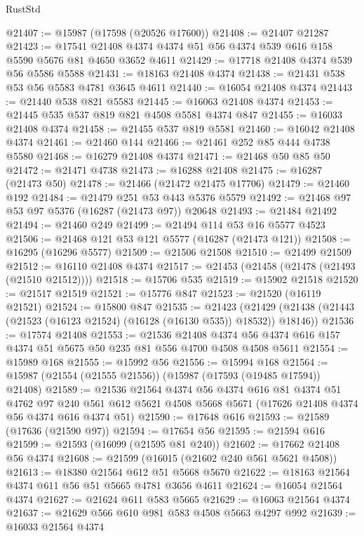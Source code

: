 \begin{lexlean}{RustStd}
\begin{coremodule}
@21407 := @15987 (@17598 (@20526 @17600))
@21408 := @21407 @21287
@21423 := @17541 @21408 @4374 @4374 @51 @56 @4374 @539 @616 @158 @5590 @5676 @81 @4650 @3652 @4611
@21429 := @17718 @21408 @4374 @539 @56 @5586 @5588
@21431 := @18163 @21408 @4374
@21438 := @21431 @538 @53 @56 @5583 @4781 @3645 @4611
@21440 := @16054 @21408 @4374
@21443 := @21440 @538 @821 @5583
@21445 := @16063 @21408 @4374
@21453 := @21445 @535 @537 @819 @821 @4508 @5581 @4374 @847
@21455 := @16033 @21408 @4374
@21458 := @21455 @537 @819 @5581
@21460 := @16042 @21408 @4374
@21461 := @21460 @144
@21466 := @21461 @252 @85 @444 @4738 @5580
@21468 := @16279 @21408 @4374
@21471 := @21468 @50 @85 @50
@21472 := @21471 @4738
@21473 := @16288 @21408
@21475 := @16287 (@21473 @50)
@21478 := @21466 (@21472 @21475 @17706)
@21479 := @21460 @192
@21484 := @21479 @251 @53 @443 @5376 @5579
@21492 := @21468 @97 @53 @97 @5376 (@16287 (@21473 @97)) @20648
@21493 := @21484 @21492
@21494 := @21460 @249
@21499 := @21494 @114 @53 @16 @5577 @4523
@21506 := @21468 @121 @53 @121 @5577 (@16287 (@21473 @121))
@21508 := @16295 (@16296 @5577)
@21509 := @21506 @21508
@21510 := @21499 @21509
@21512 := @16110 @21408 @4374
@21517 := @21453 (@21458 (@21478 (@21493 (@21510 @21512))))
@21518 := @15706 @535
@21519 := @15902 @21518
@21520 := @21517 @21519
@21521 := @15776 @847
@21523 := @21520 (@16119 @21521)
@21524 := @15800 @847
@21535 := @21423
    (@21429 (@21438 (@21443 (@21523 (@16123 @21524) (@16128 (@16130 @535)) @18532)) @18146))
@21536 := @17574 @21408
@21553 := @21536
    @21408
    @4374
    @56
    @4374
    @616
    @157
    @4374
    @51
    @5675
    @50
    @235
    @81
    @556
    @4700
    @4508
    @4508
    @5611
@21554 := @15989 @168
@21555 := @15992 @56
@21556 := @15994 @168
@21564 := @15987 (@21554 (@21555 @21556)) (@15987 (@17593 (@19485 @17594)) @21408)
@21589 := @21536
    @21564
    @4374
    @56
    @4374
    @616
    @81
    @4374
    @51
    @4762
    @97
    @240
    @561
    @612
    @5621
    @4508
    @5668
    @5671
    (@17626 @21408 @4374 @56 @4374 @616 @4374 @51)
@21590 := @17648 @616
@21593 := @21589 (@17636 (@21590 @97))
@21594 := @17654 @56
@21595 := @21594 @616
@21599 := @21593 (@16099 (@21595 @81 @240))
@21602 := @17662 @21408 @56 @4374
@21608 := @21599 (@16015 (@21602 @240 @561 @5621 @4508))
@21613 := @18380 @21564 @612 @51 @5668 @5670
@21622 := @18163 @21564 @4374 @611 @56 @51 @5665 @4781 @3656 @4611
@21624 := @16054 @21564 @4374
@21627 := @21624 @611 @583 @5665
@21629 := @16063 @21564 @4374
@21637 := @21629 @566 @610 @981 @583 @4508 @5663 @4297 @992
@21639 := @16033 @21564 @4374

\end{coremodule}
\end{lexlean}
